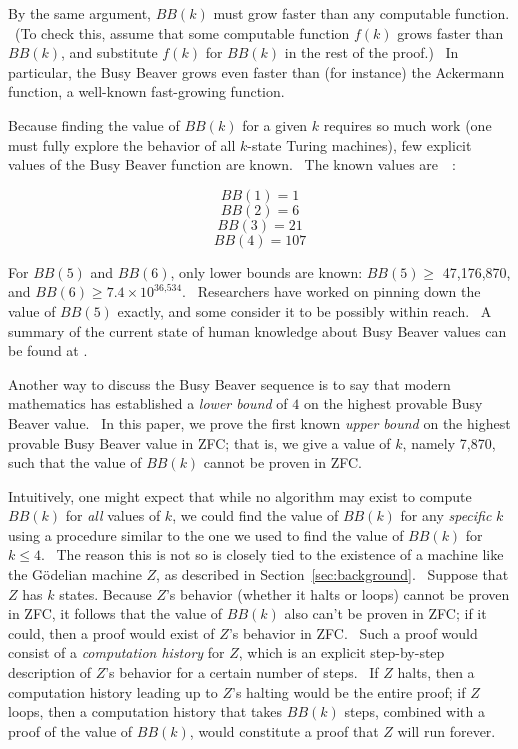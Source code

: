 \documentclass[11pt]{article}
\newcommand{\statenumcomma}{7,870, }
\begin{document}
By the same argument, $BB(k)$ must grow faster than any computable function. \ (To check this, assume that some computable function $f(k)$ grows faster than $BB(k)$, and substitute $f(k)$ for $BB(k)$ in the rest of the proof.) \ In particular, the Busy Beaver grows even faster than (for instance) the Ackermann function, a well-known fast-growing function.

Because finding the value of $BB(k)$ for a given $k$ requires so much work (one must fully explore the behavior of all $k$-state Turing machines), few explicit values of the Busy Beaver function are known. \ The known values are~\cite{bbsmall}~\cite{bbfour}:

$$BB(1) = 1$$
$$BB(2) = 6$$
$$BB(3) = 21$$
$$BB(4) = 107$$

For $BB(5)$ and $BB(6)$, only lower bounds are known: $BB(5) \ge$ 47,176,870, and $BB(6) \ge 7.4 \times 10^{\textrm{36,534}}$. \ Researchers have worked on pinning down the value of $BB(5)$ exactly, and some consider it to be possibly within reach. \ A summary of the current state of human knowledge about Busy Beaver values can be found at \cite{bbvalues}.

Another way to discuss the Busy Beaver sequence is to say that modern mathematics has established a \emph{lower bound} of $4$ on the highest provable Busy Beaver value. \ In this paper, we prove the first known \emph{upper bound} on the highest provable Busy Beaver value in ZFC; that is, we give a value of $k$, namely \statenumcomma such that the value of $BB(k)$ cannot be proven in ZFC.

Intuitively, one might expect that while no algorithm may exist to compute $BB(k)$ for \emph{all} values of $k$, we could find the value of $BB(k)$ for any \emph{specific} $k$ using a procedure similar to the one we used to find the value of $BB(k)$ for $k \le 4$. \ The reason this is not so is closely tied to the existence of a machine like the G\"{o}delian machine $Z$, as described in Section~\ref{sec:background}. \ Suppose that $Z$ has $k$ states. Because $Z$'s behavior (whether it halts or loops) cannot be proven in ZFC, it follows that the value of $BB(k)$ also can't be proven in ZFC; if it could, then a proof would exist of $Z$'s behavior in ZFC. \ Such a proof would consist of a \emph{computation history} for $Z$, which is an explicit step-by-step description of $Z$'s behavior for a certain number of steps. \ If $Z$ halts, then a computation history leading up to $Z$'s halting would be the entire proof; if $Z$ loops, then a computation history that takes $BB(k)$ steps, combined with a proof of the value of $BB(k)$, would constitute a proof that $Z$ will run forever.
\end{document}
